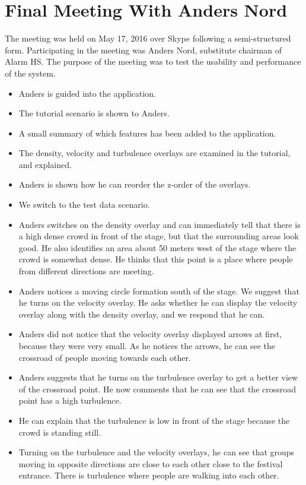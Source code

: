 \section{Final Meeting With Anders Nord}

The meeting was held on May 17, 2016 over Skype following a semi-structured form. Participating in the meeting was Anders Nord, substitute chairman of Alarm HS. The purpose of the meeting was to test the usability and performance of the system.

\begin{itemize}
    \item Anders is guided into the application.
    \item The tutorial scenario is shown to Anders.
    \item A small summary of which features has been added to the application.
    \item The density, velocity and turbulence overlays are examined in the tutorial, and explained.
    \item Anders is shown how he can reorder the z-order of the overlays.
    \item We switch to the test data scenario.
    \item Anders switches on the density overlay and can immediately tell that there is a high dense crowd in front of the stage, but that the surrounding areas look good. He also identifies an area about 50 meters west of the stage where the crowd is somewhat dense. He thinks that this point is a place where people from different directions are meeting.
    \item Anders notices a moving circle formation south of the stage. We suggest that he turns on the velocity overlay. He asks whether he can display the velocity overlay along with the density overlay, and we respond that he can.
    \item Anders did not notice that the velocity overlay displayed arrows at first, because they were very small. As he notices the arrows, he can see the crossroad of people moving towards each other.
    \item Anders suggests that he turns on the turbulence overlay to get a better view of the crossroad point. He now comments that he can see that the crossroad point has a high turbulence.
    \item He can explain that the turbulence is low in front of the stage because the crowd is standing still.
    \item Turning on the turbulence and the velocity overlays, he can see that groups moving in opposite directions are close to each other close to the festival entrance. There is turbulence where people are walking into each other.

\end{itemize}
